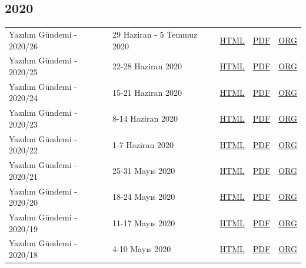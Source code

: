 \documentclass[11pt]{article}
\begin{document}
\subsection*{2020}
\label{sec:org8bfe236}
\begin{center}
\begin{tabular}{lllll}
\hline
Yazılım Gündemi - 2020/26 & 29 Haziran - 5 Temmuz 2020 & \href{arsiv/2020/26/yazilim-gundemi-2020-26.html}{HTML} & \href{arsiv/2020/26/yazilim-gundemi-2020-26.pdf}{PDF} & \href{arsiv/2020/26/yazilim-gundemi-2020-26.pdf}{ORG}\\
Yazılım Gündemi - 2020/25 & 22-28 Haziran 2020 & \href{arsiv/2020/25/yazilim-gundemi-2020-25.html}{HTML} & \href{arsiv/2020/25/yazilim-gundemi-2020-25.pdf}{PDF} & \href{arsiv/2020/25/yazilim-gundemi-2020-25.pdf}{ORG}\\
Yazılım Gündemi - 2020/24 & 15-21 Haziran 2020 & \href{arsiv/2020/24/yazilim-gundemi-2020-24.html}{HTML} & \href{arsiv/2020/24/yazilim-gundemi-2020-24.pdf}{PDF} & \href{arsiv/2020/24/yazilim-gundemi-2020-24.pdf}{ORG}\\
Yazılım Gündemi - 2020/23 & 8-14 Haziran 2020 & \href{arsiv/2020/23/yazilim-gundemi-2020-23.html}{HTML} & \href{arsiv/2020/23/yazilim-gundemi-2020-23.pdf}{PDF} & \href{arsiv/2020/23/yazilim-gundemi-2020-23.pdf}{ORG}\\
Yazılım Gündemi - 2020/22 & 1-7 Haziran 2020 & \href{arsiv/2020/22/yazilim-gundemi-2020-22.html}{HTML} & \href{arsiv/2020/22/yazilim-gundemi-2020-22.pdf}{PDF} & \href{arsiv/2020/22/yazilim-gundemi-2020-22.pdf}{ORG}\\
Yazılım Gündemi - 2020/21 & 25-31 Mayıs 2020 & \href{arsiv/2020/21/yazilim-gundemi-2020-21.html}{HTML} & \href{arsiv/2020/21/yazilim-gundemi-2020-21.pdf}{PDF} & \href{arsiv/2020/21/yazilim-gundemi-2020-21.pdf}{ORG}\\
Yazılım Gündemi - 2020/20 & 18-24 Mayıs 2020 & \href{arsiv/2020/20/yazilim-gundemi-2020-20.html}{HTML} & \href{arsiv/2020/20/yazilim-gundemi-2020-20.pdf}{PDF} & \href{arsiv/2020/20/yazilim-gundemi-2020-20.pdf}{ORG}\\
Yazılım Gündemi - 2020/19 & 11-17 Mayıs 2020 & \href{arsiv/2020/19/yazilim-gundemi-2020-19.html}{HTML} & \href{arsiv/2020/19/yazilim-gundemi-2020-19.pdf}{PDF} & \href{arsiv/2020/19/yazilim-gundemi-2020-19.pdf}{ORG}\\
Yazılım Gündemi - 2020/18 & 4-10 Mayıs 2020 & \href{arsiv/2020/18/yazilim-gundemi-2020-18.html}{HTML} & \href{arsiv/2020/18/yazilim-gundemi-2020-18.pdf}{PDF} & \href{arsiv/2020/18/yazilim-gundemi-2020-18.pdf}{ORG}\\

\end{tabular}
\end{center}
\end{document}

